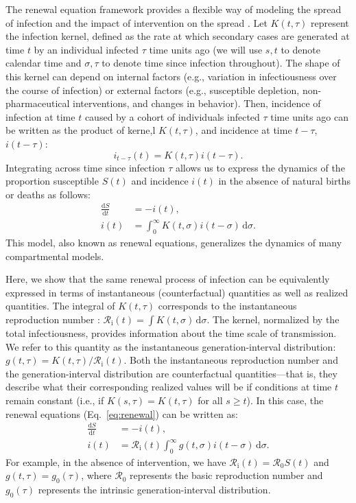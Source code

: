 \documentclass[12pt]{article}
\newcommand{\eref}[1]{Eq.~\ref{eq:#1}}
\newcommand{\Rx}[1]{\ensuremath{{\mathcal R}_{#1}}\xspace}
\newcommand{\Ro}{\Rx{0}}
\newcommand{\Ri}{\Rx{\mathrm{i}}}
\newcommand{\dd}[1]{\ensuremath{\, \mathrm{d}#1}}
\newcommand{\dsigma}{\dd{\sigma}}
\begin{document}
The renewal equation framework provides a flexible way of modeling the spread of infection and the impact of intervention on the spread \citep{fraser2007estimating}.
Let $K(t, \tau)$ represent the infection kernel, defined as the rate at which secondary cases are generated at time $t$ by an individual infected $\tau$ time units ago (we will use $s, t$ to denote calendar time and $\sigma, \tau$ to denote time since infection throughout).
The shape of this kernel can depend on internal factors (e.g., variation in infectiousness over the course of infection) or external factors (e.g., susceptible depletion, non-pharmaceutical interventions, and changes in behavior).
Then, incidence of infection at time $t$ caused by a cohort of individuals infected $\tau$ time units ago can be written as the product of kerne,l $K(t, \tau)$, and incidence at time $t-\tau$, $i(t-\tau)$:
\begin{equation}
i_{t-\tau}(t) = K(t, \tau) i(t-\tau).
\end{equation}
Integrating across time since infection $\tau$ allows us to express the dynamics of the proportion susceptible $S(t)$ and incidence $i(t)$ in the absence of natural births or deaths as follows: 
\begin{align}
\frac{\mathrm{d}S}{\mathrm{d}t} &= - i(t),\\
i(t) &= \int_0^\infty K(t, \sigma) i(t-\sigma) \dsigma.
\label{eq:renewal}
\end{align}
This model, also known as renewal equations, generalizes the dynamics of many compartmental models.

Here, we show that the same renewal process of infection can be equivalently expressed in terms of instantaneous (counterfactual) quantities as well as realized quantities.
The integral of $K(t, \tau)$ corresponds to the instantaneous reproduction number \citep{fraser2007estimating}: $\Ri(t) = \int K(t, \sigma) \dsigma$.
The kernel, normalized by the total infectiousness, provides information about the time scale of transmission.
We refer to this quantity as the instantaneous generation-interval distribution: $g(t, \tau) = K(t, \tau)/\Ri(t)$.
Both the instantaneous reproduction number and the generation-interval distribution are counterfactual quantities---that is, they describe what their corresponding realized values will be if conditions at time $t$ remain constant (i.e., if $K(s, \tau) = K(t, \tau)$ for all $s \geq t$).
In this case, the renewal equations (\eref{renewal}) can be written as:
\begin{align}
\frac{\mathrm{d}S}{\mathrm{d}t} &= - i(t),\\
i(t) &= \Ri(t) \int_0^\infty g(t, \sigma) i(t-\sigma) \dsigma.
\label{eq:renewal_instantaneous}
\end{align}
For example, in the absence of intervention, we have $\Ri(t) = \Ro S(t)$ and $g(t, \tau) = g_0(\tau)$, where $\Ro$ represents the basic reproduction number and $g_0(\tau)$ represents the intrinsic generation-interval distribution.
\end{document}
